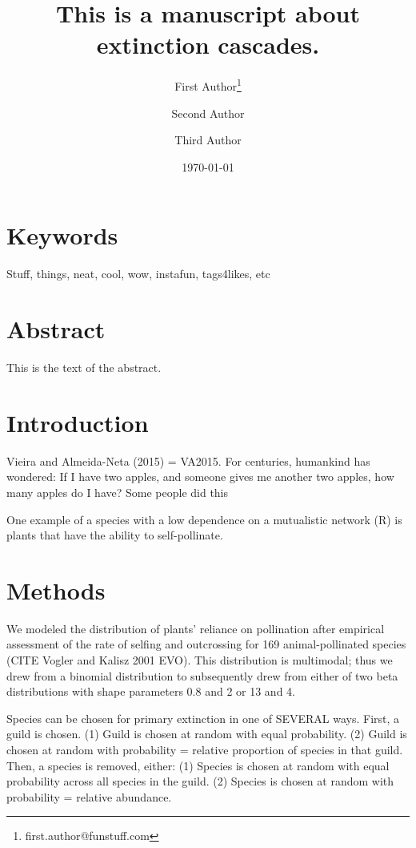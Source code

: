 \documentclass[11pt,letterpaper]{article} %
\date{\today}
\title{This is a manuscript about extinction cascades.}
\author[1]{First Author\thanks{first.author@funstuff.com}}
\author[1,2]{Second Author}
\author[2]{Third Author}
\affil[1]{Department of Computer Science, \LaTeX\ University}
\affil[2]{Department of Mechanical Engineering, Superfabulous University}
\begin{document}
\maketitle
\linenumbers %
\def\linenumberfont{\normalfont\small\rmfamily} %


\section*{Keywords}
Stuff, things, neat, cool, wow, instafun, tags4likes, etc

\section*{Abstract}
This is the text of the abstract.

\section*{Introduction}

Vieira and Almeida-Neta (2015) = VA2015.
For centuries, humankind has wondered: If I have two apples, and someone gives me another two apples, how many apples do I have? Some people did this \citep{Darwin1859}

One example of a species with a low dependence on a mutualistic network (R) is plants that have the ability to self-pollinate. 


\section*{Methods}
We modeled the distribution of plants' reliance on pollination after empirical assessment of the rate of selfing and outcrossing for 169 animal-pollinated species (CITE Vogler and Kalisz 2001 EVO). This distribution is multimodal; thus we drew from a binomial distribution to subsequently drew from either of two beta distributions with shape parameters 0.8 and 2 or 13 and 4.


Species can be chosen for primary extinction in one of SEVERAL ways. First, a guild is chosen.
(1) Guild is chosen at random with equal probability.
(2) Guild is chosen at random with probability = relative proportion of species in that guild.
Then, a species is removed, either:
(1) Species is chosen at random with equal probability across all species in the guild.
(2) Species is chosen at random with probability = relative abundance.
\end{document}
